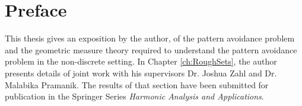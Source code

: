 
\chapter{Preface}

This thesis gives an exposition by the author, of the pattern avoidance problem and the geometric measure theory required to understand the pattern avoidance problem in the non-discrete setting. In Chapter \ref{ch:RoughSets}, the author presents details of joint work with his supervisors Dr. Joshua Zahl and Dr. Malabika Pramanik. The results of that section have been submitted for publication in the Springer Series \emph{Harmonic Analysis and Applications}.